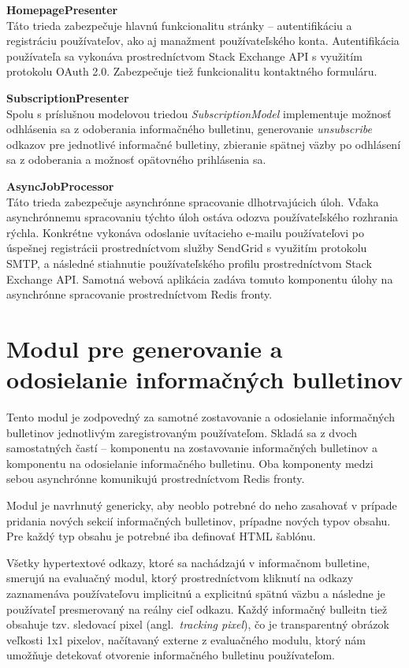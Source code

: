 \textbf{HomepagePresenter}\\
Táto trieda zabezpečuje hlavnú funkcionalitu stránky -- autentifikáciu a registráciu používateľov, ako aj manažment
používateľského konta. Autentifikácia používateľa sa vykonáva prostredníctvom Stack Exchange API s využitím protokolu OAuth 2.0.
Zabezpečuje tiež funkcionalitu kontaktného formuláru.

\textbf{SubscriptionPresenter}\\
Spolu s príslušnou modelovou triedou \textit{SubscriptionModel} implementuje možnosť odhlásenia sa z odoberania
informačného bulletinu, generovanie \textit{unsubscribe} odkazov pre jednotlivé informačné bulletiny, zbieranie spätnej
väzby po odhlásení sa z odoberania a možnosť opätovného prihlásenia sa.

\textbf{AsyncJobProcessor}\\
Táto trieda zabezpečuje asynchrónne spracovanie dlhotrvajúcich úloh. Vďaka asynchrónnemu spracovaniu týchto úloh ostáva
odozva používateľského rozhrania rýchla. Konkrétne vykonáva odoslanie uvítacieho e-mailu používateľovi po úspešnej
registrácii prostredníctvom služby SendGrid s využitím protokolu SMTP, a následné stiahnutie používateľského profilu
prostredníctvom Stack Exchange API.
Samotná webová aplikácia zadáva tomuto komponentu úlohy na asynchrónne spracovanie prostredníctvom Redis fronty.


\section{Modul pre generovanie a odosielanie informačných bulletinov}

Tento modul je zodpovedný za samotné zostavovanie a odosielanie informačných bulletinov jednotlivým zaregistrovaným
používateľom. Skladá sa z dvoch samostatných častí -- komponentu na zostavovanie informačných bulletinov a komponentu
na odosielanie informačného bulletinu. Oba komponenty medzi sebou asynchrónne komunikujú prostredníctvom Redis fronty.

Modul je navrhnutý genericky, aby neoblo potrebné do neho zasahovať v prípade pridania nových sekcií informačných bulletinov,
prípadne nových typov obsahu. Pre každý typ obsahu je potrebné iba definovať HTML šablónu.

Všetky hypertextové odkazy, ktoré sa nachádzajú v informačnom bulletine, smerujú na evaluačný modul, ktorý prostredníctvom
kliknutí na odkazy zaznamenáva používateľovu implicitnú a explicitnú spätnú väzbu a následne je používateľ presmerovaný
na reálny cieľ odkazu. Každý informačný bulleitn tiež obsahuje tzv. sledovací pixel (angl.~\textit{tracking pixel}), čo je
transparentný obrázok veľkosti 1x1 pixelov, načítavaný externe z evaluačného modulu, ktorý nám umožňuje detekovať otvorenie informačného
bulletinu používateľom.

